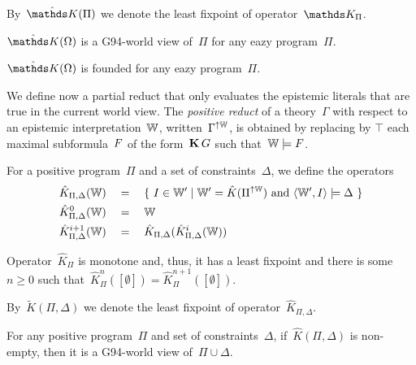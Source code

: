 By~$\TKPf$ we denote the least fixpoint of operator~$\TKPo$.

\begin{conjecture}
    \label{conj:tp.g94}
    $\TKf{\Omega}$ is a G94-world view of~$\Pi$ for any eazy program~$\Pi$.
\end{conjecture}

\begin{conjecture}
    \label{conj:tp.founded}
    $\TKf{\Omega}$ is founded for any eazy program~$\Pi$.
\end{conjecture}

We define now a partial reduct that only evaluates the epistemic literals that are true in the current world view.
%
The \emph{positive reduct} of a theory~$\Gamma$ 
with respect to an epistemic interpretation~$\mathbb{W}$, written~$\Gamma^{\uparrow\mathbb{W}}$, is obtained by replacing by $\top$ each maximal subformula~$F$ of the form~$\operatorname{\mathbf{K}} G$ such that~$\mathbb{W} \models F$.


For a positive program~$\Pi$ and a set of constraints~$\Delta$, we define the operators
\begin{align}
    \hat{K}_{\Pi,\Delta}(\mathbb{W}) \quad&=\quad \{ \ I \in \mathbb{W}' \mid \mathbb{W}' =  \hat{K}(\Pi^{\uparrow\mathbb{W}}) \text{ and }\langle \mathbb{W}',I \rangle \models \Delta \ \}
    \\
    \hat{K}_{\Pi,\Delta}^0(\mathbb{W}) \quad&=\quad \mathbb{W}
    \\
    \hat{K}_{\Pi,\Delta}^{i+1}(\mathbb{W}) \quad&=\quad \hat{K}_{\Pi,\Delta}(\hat{K}_{\Pi,\Delta}^i(\mathbb{W}))
\end{align}

\begin{conjecture}
    \label{conj:tp2.monotone}
    Operator~$\hat{K}_\Pi$ is monotone and, thus, it has a least fixpoint and there is some~$n \geq 0$ such that~$\hat{K}_\Pi^n([\emptyset]) = \hat{K}_\Pi^{n+1}([\emptyset])$.
\end{conjecture}

By~$\tilde{K}(\Pi,\Delta)$ we denote the least fixpoint of operator~$\hat{K}_{\Pi,\Delta}$.

\begin{conjecture}
    \label{conj:tp2.g94}
    For any positive program~$\Pi$ and set of constraints~$\Delta$, if~$\hat{K}(\Pi,\Delta)$ is non\nobreakdash-empty, then it is a G94-world view of~$\Pi \cup \Delta$.
\end{conjecture}

